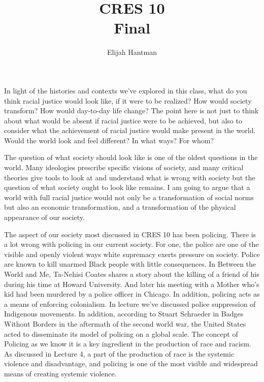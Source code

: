 \documentclass[12pt]{article}
\title{\Huge{CRES 10}\\Final}
\author{\huge{Elijah Hantman}}
\date{}
\begin{document}
\maketitle
\newpage


\begin{mdframed}
    In light of the histories and contexts we’ve explored in this class, what do you think racial justice would look like, if it were to be realized? How would society transform? How would day-to-day life change? The point here is not just to think about what would be absent if racial justice were to be achieved, but also to consider what the achievement of racial justice would make present in the world. Would the world look and feel different? In what ways? For whom?
\end{mdframed}

The question of what society should look like is one of the oldest questions in the world. Many ideologies
prescribe specific visions of society, and many critical theories give tools to look at and understand what is
wrong with society but the question of what society ought to look like remains. I am going to argue that a world
with full racial justice would not only be a transformation of social norms but also an economic transformation,
and a transformation of the physical appearance of our society.

The aspect of our society most discussed in CRES 10 has been policing. There is a lot wrong with policing in our current society.
For one, the police are one of the visible and openly violent ways white supremacy exerts pressure on society. 
Police are known to kill unarmed Black people with little consequences. In Between the World and Me, Ta-Nehisi Coates\textcite{Coates} shares
a story about the killing of a friend of his during his time at Howard University. And later his meeting with
a Mother who’s kid had been murdered by a police officer in Chicago.
In addition, policing acts as a means of enforcing colonialism. In lecture\textcite{lecture} we’ve discussed police suppression of
Indigenous movements. In addition, according to Stuart Schraeder in Badges Without Borders\textcite{Badges} in the aftermath of the
second world war, the United States acted to disseminate its model of policing on a global scale. 
The concept of Policing as we know it is a key ingredient in the production of race and racism. As discussed
in Lecture 4, a part of the production of race is the systemic violence and disadvantage, and policing is one
of the most visible and widespread means of creating systemic violence.
\end{document}
